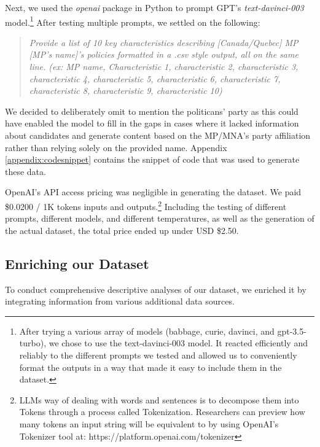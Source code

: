 \documentclass{article}
\begin{document}
Next, we used the \textit{openai} package in Python to prompt GPT's \textit{text-davinci-003} model.\footnote{After trying a various array of models (babbage, curie, davinci, and gpt-3.5-turbo), we chose to use the text-davinci-003 model. It reacted efficiently and reliably to the different prompts we tested and allowed us to conveniently format the outputs in a way that made it easy to include them in the dataset.} After testing multiple prompts, we settled on the following:

\begin{quote}
    \textit{Provide a list of 10 key characteristics describing [Canada/Quebec] MP [MP's name]'s policies formatted in a .csv style output, all on the same line. (ex: MP name, Characteristic 1, characteristic 2, characteristic 3, characteristic 4, characteristic 5, characteristic 6, characteristic 7, characteristic 8, characteristic 9, characteristic 10)}
\end{quote}

We decided to deliberately omit to mention the politicans' party as this could have enabled the model to fill in the gaps in cases where it lacked information about candidates and generate content based on the MP/MNA's party affiliation rather than relying solely on the provided name. Appendix \ref{appendix:codesnippet} contains the snippet of code that was used to generate these data.

OpenAI's API access pricing was negligible in generating the dataset. We paid \$0.0200 / 1K tokens inputs and outputs.\footnote{LLMs way of dealing with words and sentences is to decompose them into Tokens through a process called Tokenization.\parencite{maeda_bolanos23} Researchers can preview how many tokens an input string will be equivalent to by using OpenAI's Tokenizer tool at: https://platform.openai.com/tokenizer} Including the testing of different prompts, different models, and different temperatures, as well as the generation of the actual dataset, the total price ended up under USD \$2.50.

\subsection{Enriching our Dataset}

To conduct comprehensive descriptive analyses of our dataset, we enriched it by integrating information from various additional data sources.
\end{document}
